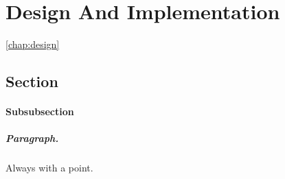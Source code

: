 \chapter{Design And Implementation}
\autoref{chap:design}
\section{Section}
%
\subsubsection{Subsubsection}

\paragraph{Paragraph.} Always with a point.


